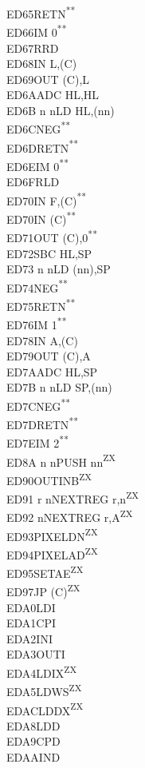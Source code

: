 \documentclass[12pt,twoside,openright,a4paper]{book}
\newcommand{\UNDOC}{\textnormal{\textsuperscript{**}}}
\newcommand{\ZXN}{\textnormal{\textsuperscript{ZX}}}
\begin{document}
\begin{multicols}{3}
{\begin{tabbing}
	ED65\>RETN\UNDOC\\
	ED66\>IM 0\UNDOC\\
	ED67\>RRD\\
	ED68\>IN L,(C)\\
	ED69\>OUT (C),L\\
	ED6A\>ADC HL,HL\\
	ED6B n n\>LD HL,(nn)\\
	ED6C\>NEG\UNDOC\\
	ED6D\>RETN\UNDOC\\
	ED6E\>IM 0\UNDOC\\
	ED6F\>RLD\\
	ED70\>IN F,(C)\UNDOC\\
	ED70\>IN (C)\UNDOC\\
	ED71\>OUT (C),0\UNDOC\\
	ED72\>SBC HL,SP\\
	ED73 n n\>LD (nn),SP\\
	ED74\>NEG\UNDOC\\
	ED75\>RETN\UNDOC\\
	ED76\>IM 1\UNDOC\\
	ED78\>IN A,(C)\\
	ED79\>OUT (C),A\\
	ED7A\>ADC HL,SP\\
	ED7B n n\>LD SP,(nn)\\
	ED7C\>NEG\UNDOC\\
	ED7D\>RETN\UNDOC\\
	ED7E\>IM 2\UNDOC\\
	ED8A n n\>PUSH nn\ZXN\\
	ED90\>OUTINB\ZXN\\
	ED91 r n\>NEXTREG r,n\ZXN\\
	ED92 n\>NEXTREG r,A\ZXN\\
	ED93\>PIXELDN\ZXN\\
	ED94\>PIXELAD\ZXN\\
	ED95\>SETAE\ZXN\\
	ED97\>JP (C)\ZXN\\
	EDA0\>LDI\\
	EDA1\>CPI\\
	EDA2\>INI\\
	EDA3\>OUTI\\
	EDA4\>LDIX\ZXN\\
	EDA5\>LDWS\ZXN\\
	EDAC\>LDDX\ZXN\\
	EDA8\>LDD\\
	EDA9\>CPD\\
	EDAA\>IND\\

\end{tabbing}}
\end{multicols}
\end{document}

